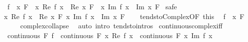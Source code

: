 \begin{isabellebody}
\ \ {\isachardoublequoteopen}{\isacharparenleft}{\kern0pt}f\ {\isasymlonglongrightarrow}\ x{\isacharparenright}{\kern0pt}\ F\ {\isasymlongleftrightarrow}\ {\isacharparenleft}{\kern0pt}{\isacharparenleft}{\kern0pt}{\isacharparenleft}{\kern0pt}{\isasymlambda}x{\isachardot}{\kern0pt}\ Re\ {\isacharparenleft}{\kern0pt}f\ x{\isacharparenright}{\kern0pt}{\isacharparenright}{\kern0pt}\ {\isasymlonglongrightarrow}\ Re\ x{\isacharparenright}{\kern0pt}\ F\ {\isasymand}\ {\isacharparenleft}{\kern0pt}{\isacharparenleft}{\kern0pt}{\isasymlambda}x{\isachardot}{\kern0pt}\ Im\ {\isacharparenleft}{\kern0pt}f\ x{\isacharparenright}{\kern0pt}{\isacharparenright}{\kern0pt}\ {\isasymlonglongrightarrow}\ Im\ x{\isacharparenright}{\kern0pt}\ F{\isacharparenright}{\kern0pt}{\isachardoublequoteclose}\isanewline
%
\isadelimproof
%
\endisadelimproof
%
\isatagproof
{}\isamarkupfalse%
\ safe\isanewline
\ \ \isamarkupfalse%
\ {\isachardoublequoteopen}{\isacharparenleft}{\kern0pt}{\isacharparenleft}{\kern0pt}{\isasymlambda}x{\isachardot}{\kern0pt}\ Re\ {\isacharparenleft}{\kern0pt}f\ x{\isacharparenright}{\kern0pt}{\isacharparenright}{\kern0pt}\ {\isasymlonglongrightarrow}\ Re\ x{\isacharparenright}{\kern0pt}\ F{\isachardoublequoteclose}\ {\isachardoublequoteopen}{\isacharparenleft}{\kern0pt}{\isacharparenleft}{\kern0pt}{\isasymlambda}x{\isachardot}{\kern0pt}\ Im\ {\isacharparenleft}{\kern0pt}f\ x{\isacharparenright}{\kern0pt}{\isacharparenright}{\kern0pt}\ {\isasymlonglongrightarrow}\ Im\ x{\isacharparenright}{\kern0pt}\ F{\isachardoublequoteclose}\isanewline
\ \ \isamarkupfalse%
\ tendsto{\isacharunderscore}{\kern0pt}Complex{\isacharbrackleft}{\kern0pt}OF\ this{\isacharbrackright}{\kern0pt}\ \isamarkupfalse%
\ {\isachardoublequoteopen}{\isacharparenleft}{\kern0pt}f\ {\isasymlonglongrightarrow}\ x{\isacharparenright}{\kern0pt}\ F{\isachardoublequoteclose}\isanewline
\ \ \ \ \isamarkupfalse%
\ complex{\isachardot}{\kern0pt}collapse\ \isacommand{{\isachardot}{\kern0pt}}\isamarkupfalse%
\isanewline
{}\isamarkupfalse%
\ {\isacharparenleft}{\kern0pt}auto\ intro{\isacharcolon}{\kern0pt}\ tendsto{\isacharunderscore}{\kern0pt}intros{\isacharparenright}{\kern0pt}%
\endisatagproof
{\isafoldproof}%
%
\isadelimproof
\isanewline
%
\endisadelimproof
\isanewline
{}\isamarkupfalse%
\ continuous{\isacharunderscore}{\kern0pt}complex{\isacharunderscore}{\kern0pt}iff{\isacharcolon}{\kern0pt}\isanewline
\ \ {\isachardoublequoteopen}continuous\ F\ f\ {\isasymlongleftrightarrow}\ continuous\ F\ {\isacharparenleft}{\kern0pt}{\isasymlambda}x{\isachardot}{\kern0pt}\ Re\ {\isacharparenleft}{\kern0pt}f\ x{\isacharparenright}{\kern0pt}{\isacharparenright}{\kern0pt}\ {\isasymand}\ continuous\ F\ {\isacharparenleft}{\kern0pt}{\isasymlambda}x{\isachardot}{\kern0pt}\ Im\ {\isacharparenleft}{\kern0pt}f\ x{\isacharparenright}{\kern0pt}{\isacharparenright}{\kern0pt}{\isachardoublequoteclose}\isanewline

\end{isabellebody}
